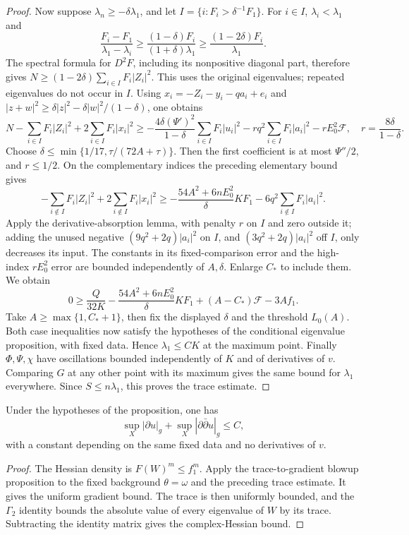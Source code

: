 \begin{proof}
Now suppose $\lambda_n\geq-\delta\lambda_1$, and let $I=\{i:F_i>\delta^{-1}F_1\}$. For $i\in I$, $\lambda_i<\lambda_1$ and
\[
 \frac{F_i-F_1}{\lambda_1-\lambda_i}
       \geq\frac{(1-\delta)F_i}{(1+\delta)\lambda_1}
       \geq\frac{(1-2\delta)F_i}{\lambda_1}.
\]
The spectral formula for $D^2F$, including its nonpositive diagonal part, therefore gives $N\geq(1-2\delta)\sum_{i\in I}F_i|Z_i|^2$. This uses the original eigenvalues; repeated eigenvalues do not occur in $I$.
Using $x_i=-Z_i-y_i-qa_i+e_i$ and $|z+w|^2\geq\delta|z|^2-\delta|w|^2/(1-\delta)$, one obtains
\[
 N-\sum_{i\in I}F_i|Z_i|^2+2\sum_{i\in I}F_i|x_i|^2
 \geq-\frac{4\delta(\Psi')^2}{1-\delta}\sum_{i\in I}F_i|u_i|^2
       -r q^2\sum_{i\in I}F_i|a_i|^2-rE_0^2\mathcal F,
 \quad r=\frac{8\delta}{1-\delta}.
\]
Choose $\delta\leq\min\{1/17,\tau/(72A+\tau)\}$. Then the first coefficient is at most $\Psi''/2$, and $r\leq1/2$. On the complementary indices the preceding elementary bound gives
\[
 -\sum_{i\notin I}F_i|Z_i|^2+2\sum_{i\notin I}F_i|x_i|^2
 \geq-\frac{54A^2+6nE_0^2}{\delta}KF_1
       -6q^2\sum_{i\notin I}F_i|a_i|^2.
\]
Apply the derivative-absorption lemma, with penalty $r$ on $I$ and zero outside it; adding the unused negative $(9q^2+2q)|a_i|^2$ on $I$, and $(3q^2+2q)|a_i|^2$ off $I$, only decreases its input. The constants in its fixed-comparison error and the high-index $rE_0^2$ error are bounded independently of $A,\delta$. Enlarge $C_*$ to include them. We obtain
\[
 0\geq\frac{Q}{32K}-\frac{54A^2+6nE_0^2}{\delta}KF_1
                +(A-C_*)\mathcal F-3Af_1.
\]
Take $A\geq\max\{1,C_*+1\}$, then fix the displayed $\delta$ and the threshold $L_0(A)$. Both case inequalities now satisfy the hypotheses of the conditional eigenvalue proposition, with fixed data. Hence $\lambda_1\leq CK$ at the maximum point.
Finally $\Phi,\Psi,\chi$ have oscillations bounded independently of $K$ and of derivatives of $v$. Comparing $G$ at any other point with its maximum gives the same bound for $\lambda_1$ everywhere. Since $S\leq n\lambda_1$, this proves the trace estimate.
\end{proof}

\begin{corollary}\label{draft:600-prescribed-potential-complex-hessian}
Under the hypotheses of the proposition, one has
\[
 \sup_X|\partial u|_g+\sup_X|\partial\bar\partial u|_g\leq C,
\]
with a constant depending on the same fixed data and no derivatives of $v$.
\end{corollary}
\begin{proof}
The Hessian density is $F(W)^m\leq f_1^m$. Apply the trace-to-gradient blowup proposition to the fixed background $\theta=\omega$ and the preceding trace estimate. It gives the uniform gradient bound. The trace is then uniformly bounded, and the $\Gamma_2$ identity bounds the absolute value of every eigenvalue of $W$ by its trace. Subtracting the identity matrix gives the complex-Hessian bound.
\end{proof}

